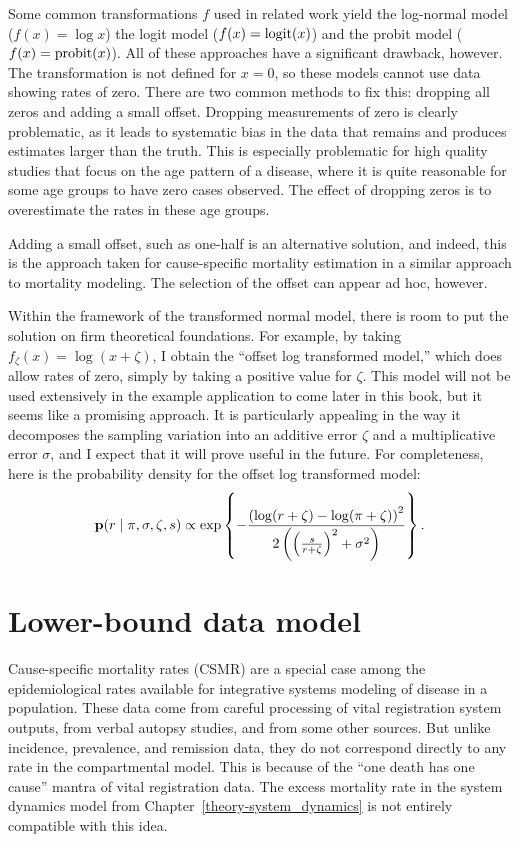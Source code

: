 Some common transformations $f$ used in related work yield the
log-normal model ($f(x) = \log x$) the logit model ($f(x) = \operatorname{logit}(x)$)
and the probit model ($f(x) = \operatorname{probit}(x)$).  All of these approaches
have a significant drawback, however.  The transformation is not
defined for $x=0$, so these models cannot use data showing rates of
zero. There are two common methods to fix this: dropping all zeros
and adding a small offset.  Dropping measurements of zero is clearly
problematic, as it leads to systematic bias in the data that remains
and produces estimates larger than the truth.  This is especially
problematic for high quality studies that focus on the age pattern of
a disease, where it is quite reasonable for some age groups to have
zero cases observed.  The effect of dropping zeros is to overestimate
the rates in these age groups.

Adding a small offset, such as one-half is an alternative solution,
and indeed, this is the approach taken for cause-specific mortality
estimation in a similar approach to mortality
modeling.\cite{girosi_demographic_2008} The selection of the offset
can appear ad hoc, however.

Within the framework of the transformed normal model, there is room to
put the solution on firm theoretical foundations.  For example, by
taking $f_\zeta(x) = \log(x + \zeta)$, I obtain the ``offset log
transformed model,'' which does allow rates of zero, simply by taking
a positive value for $\zeta$.  This model will not be used extensively
in the example application to come later in this book, but it seems
like a promising approach.  It is particularly appealing in the way it
decomposes the sampling variation into an additive error $\zeta$ and a
multiplicative error $\sigma$, and I expect that it will prove useful
in the future.  For completeness, here is the probability density for
the offset log transformed model:
\[
\mathbf{p}(r\;|\; \pi, \sigma,\zeta, s)
\propto \exp\left\{
-\frac{\left(\log(r+\zeta)-\log(\pi+\zeta)\right)^2}
      {2\left(\left(\frac{s}{r+\zeta}\right)^2+\sigma^2\right)}
\right\}.
\]

\section{Lower-bound data model}
\label{theory-csmr}
Cause-specific mortality rates (CSMR) are a special case among the
epidemiological rates available for integrative systems modeling of
disease in a population.  These data come from careful processing of
vital registration system outputs, from verbal autopsy studies, and
from some other sources. But unlike incidence, prevalence, and
remission data, they do not correspond directly to any rate in the
compartmental model.  This is because of the ``one death has one
cause'' mantra of vital registration data.  The excess mortality rate
in the system dynamics model from Chapter~\ref{theory-system_dynamics}
is not entirely compatible with this idea.

